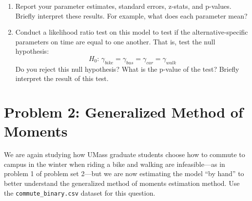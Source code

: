 \documentclass[11pt,letterpaper]{article}
\begin{document}
\begin{enumerate}[label=\alph*., leftmargin=*]
	\begin{enumerate}[label=\roman*.]
		\item Report your parameter estimates, standard errors, z-stats, and p-values. Briefly interpret these results. For example, what does each parameter mean?

		\item Conduct a likelihood ratio test on this model to test if the alternative-specific parameters on time are equal to one another. That is, test the null hypothesis:
		$$H_0 \text{: } \gamma_{bike} = \gamma_{bus} = \gamma_{car} = \gamma_{walk}$$
		Do you reject this null hypothesis? What is the p-value of the test? Briefly interpret the result of this test.
	\end{enumerate}
\end{enumerate}

\section*{Problem 2: Generalized Method of Moments}

We are again studying how UMass graduate students choose how to commute to campus in the winter when riding a bike and walking are infeasible---as in problem 1 of problem set 2---but we are now estimating the model ``by hand'' to better understand the generalized method of moments estimation method. Use the \texttt{commute\_binary.csv} dataset for this question.
\end{document}
